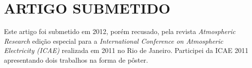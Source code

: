 \chapter{ARTIGO SUBMETIDO}

Este artigo foi submetido em 2012, porém recusado, pela revista \textit{Atmospheric Research} edição especial para a \textit{International Conference on Atmospheric Electricity (ICAE)} realizada em 2011 no Rio de Janeiro. Participei da ICAE 2011 apresentando dois trabalhos na forma de pôster.




